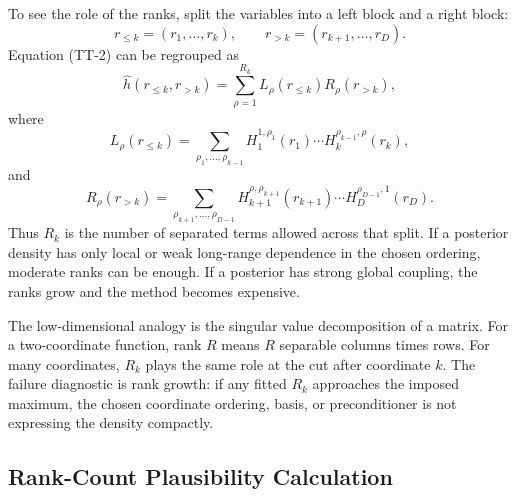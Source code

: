 \documentclass[11pt]{article}
\numberwithin{equation}{section}
\begin{document}
To see the role of the ranks, split the variables into a left block and a right
block:
\[
    r_{\le k}=(r_1,\ldots,r_k),\qquad
    r_{>k}=(r_{k+1},\ldots,r_D).
\]
Equation (TT-2) can be regrouped as
\begin{equation}
    \widehat h(r_{\le k},r_{>k})
    =
    \sum_{\rho=1}^{R_k}
    L_\rho(r_{\le k})R_\rho(r_{>k}),
    \label{eq:p24-tt-2a}
\end{equation}
where
\[
    L_\rho(r_{\le k})
    =
    \sum_{\rho_1,\ldots,\rho_{k-1}}
    H_1^{1,\rho_1}(r_1)\cdots H_k^{\rho_{k-1},\rho}(r_k),
\]
and
\[
    R_\rho(r_{>k})
    =
    \sum_{\rho_{k+1},\ldots,\rho_{D-1}}
    H_{k+1}^{\rho,\rho_{k+1}}(r_{k+1})\cdots
    H_D^{\rho_{D-1},1}(r_D).
\]
Thus \(R_k\) is the number of separated terms allowed across that split.  If a
posterior density has only local or weak long-range dependence in the chosen
ordering, moderate ranks can be enough.  If a posterior has strong global
coupling, the ranks grow and the method becomes expensive.

The low-dimensional analogy is the singular value decomposition of a matrix.
For a two-coordinate function, rank \(R\) means \(R\) separable columns times
rows.  For many coordinates, \(R_k\) plays the same role at the cut after
coordinate \(k\).  The failure diagnostic is rank growth: if any fitted
\(R_k\) approaches the imposed maximum, the chosen coordinate ordering, basis,
or preconditioner is not expressing the density compactly.

\subsection*{Rank-Count Plausibility Calculation}
\end{document}
